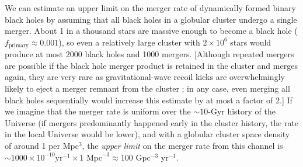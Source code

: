 \documentclass[review]{elsarticle}
\begin{document}
We can estimate an upper limit on the merger rate of dynamically formed binary black holes by assuming that all black holes in a globular cluster undergo a single merger.  About 1 in a thousand stars are massive enough to become a black hole ($f_\textrm{primary} \approx 0.001$), so even a relatively large cluster with $2\times 10^6$ stars would produce at most 2000 black holes and 1000 mergers.  [Although repeated mergers are possible if the black hole merger product is retained in the cluster and merges again, they are very rare as gravitational-wave recoil kicks are overwhelmingly likely to eject a merger remnant from the cluster \citep{Rodriguez:2018}; in any case, even merging all black holes sequentially would increase this estimate by at most a factor of 2.]  If we imagine that the merger rate is uniform over the $\sim 10$-Gyr history of the Universe (if mergers predominantly happened early in the cluster history, the rate in the local Universe would be lower), and with a globular cluster space density of around 1 per Mpc$^3$, the {\it upper limit} on the merger rate from this channel is $\sim 1000 \times 10^{-10} \textrm{yr}^{-1} \times 1 \textrm{ Mpc}^{-3} \approx 100$ Gpc$^{-3}$ yr$^{-1}$.
\end{document}
